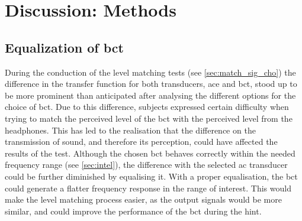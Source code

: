\section{Discussion: Methods}\label{sec:disc_meth}

\subsection*{Equalization of \gls{bct}}
During the conduction of the level matching tests (see \autoref{sec:match_sig_cho}) the difference in the transfer function for both transducers, \gls{ace} and \gls{bct}, stood up to be more prominent than anticipated after analysing the different options for the choice of \gls{bct}. Due to this difference, subjects expressed certain difficulty when trying to match the perceived level of the \gls{bct} with the perceived level from the headphones. This has led to the realisation that the difference on the transmission of sound, and therefore its perception, could have affected the results of the test.
Although the chosen \gls{bct} behaves correctly within the needed frequency range (see \autoref{sec:intel}), the difference with the selected \gls{ac} transducer could be further diminished by equalising it. With a proper equalisation, the \gls{bct} could generate a flatter frequency response in the range of interest. This would make the level matching process easier, as the output signals would be more similar, and could improve the performance of the \gls{bct} during the \gls{hint}.

